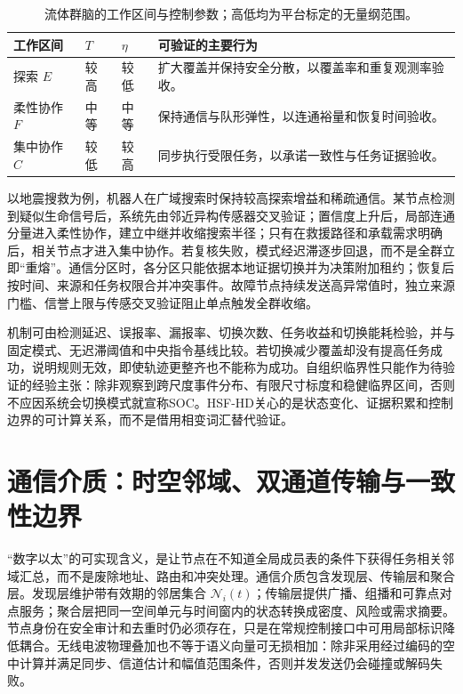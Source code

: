 \begin{table}[htbp]
\centering
\small
\begin{tabularx}{\textwidth}{l l l X}
\toprule
工作区间 & $T$ & $\eta$ & 可验证的主要行为 \\
\midrule
探索 $E$ & 较高 & 较低 & 扩大覆盖并保持安全分散，以覆盖率和重复观测率验收。 \\
柔性协作 $F$ & 中等 & 中等 & 保持通信与队形弹性，以连通裕量和恢复时间验收。 \\
集中协作 $C$ & 较低 & 较高 & 同步执行受限任务，以承诺一致性与任务证据验收。 \\
\bottomrule
\end{tabularx}
\caption{流体群脑的工作区间与控制参数；高低均为平台标定的无量纲范围。}
\label{tab:swarm_phase_diagram}
\end{table}

以地震搜救为例，机器人在广域搜索时保持较高探索增益和稀疏通信。某节点检测到疑似生命信号后，系统先由邻近异构传感器交叉验证；置信度上升后，局部连通分量进入柔性协作，建立中继并收缩搜索半径；只有在救援路径和承载需求明确后，相关节点才进入集中协作。若复核失败，模式经迟滞逐步回退，而不是全群立即“重熔”。通信分区时，各分区只能依据本地证据切换并为决策附加租约；恢复后按时间、来源和任务权限合并冲突事件。故障节点持续发送高异常值时，独立来源门槛、信誉上限与传感交叉验证阻止单点触发全群收缩。

机制可由检测延迟、误报率、漏报率、切换次数、任务收益和切换能耗检验，并与固定模式、无迟滞阈值和中央指令基线比较。若切换减少覆盖却没有提高任务成功，说明规则无效，即使轨迹更整齐也不能称为成功。自组织临界性只能作为待验证的经验主张：除非观察到跨尺度事件分布、有限尺寸标度和稳健临界区间，否则不应因系统会切换模式就宣称SOC。HSF-HD关心的是状态变化、证据积累和控制边界的可计算关系，而不是借用相变词汇替代验证。

\section{通信介质：时空邻域、双通道传输与一致性边界}
\label{sec:digital_ether_architecture}

“数字以太”的可实现含义，是让节点在不知道全局成员表的条件下获得任务相关邻域汇总，而不是废除地址、路由和冲突处理。通信介质包含发现层、传输层和聚合层。发现层维护带有效期的邻居集合 $\mathcal N_i(t)$；传输层提供广播、组播和可靠点对点服务；聚合层把同一空间单元与时间窗内的状态转换成密度、风险或需求摘要。节点身份在安全审计和去重时仍必须存在，只是在常规控制接口中可用局部标识降低耦合。无线电波物理叠加也不等于语义向量可无损相加：除非采用经过编码的空中计算并满足同步、信道估计和幅值范围条件，否则并发发送仍会碰撞或解码失败。

